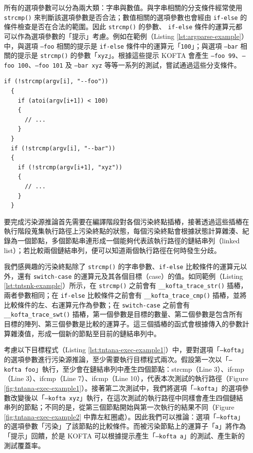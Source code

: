 所有的選項參數可以分為兩大類：字串與數值。與字串相關的分支條件經常使用 \texttt{strcmp()} 來判斷該選項參數是否合法；數值相關的選項參數也會經由 \texttt{if-else} 的條件檢查是否在合法的範圍。因此  \texttt{strcmp()} 的參數、 \texttt{if-else} 條件的運算元都可以作為選項參數的「提示」考慮。例如在範例（Listing \ref{lst:argparse-example}）中，與選項 \texttt{--foo} 相關的提示是 \texttt{if-else} 條件中的運算元「\texttt{100}」；與選項 \texttt{--bar} 相關的提示是 \texttt{strcmp()} 的參數「\texttt{xyz}」。根據這些提示 KOFTA 會產生 \texttt{--foo 99}、\texttt{--foo 100}、\texttt{--foo 101} 及 \texttt{--bar xyz} 等等一系列的測試，嘗試通過這些分支條件。

\begin{lstlisting}[caption=選項參數解析範例, label=lst:argparse-example]
  if (!strcmp(argv[i], "--foo"))
  {
    if (atoi(argv[i+1]) < 100)
    {
      // ...
    }
  }
  if (!strcmp(argv[i], "--bar"))
  {
    if (!strcmp(argv[i+1], "xyz"))
    {
      // ...
    }
  }
\end{lstlisting}

要完成污染源推論首先需要在編譯階段對各個污染終點插樁，接著透過這些插樁在執行階段蒐集執行路徑上污染終點的狀態，每個污染終點會根據狀態計算雜湊、紀錄為一個節點，多個節點串連形成一個能夠代表該執行路徑的鏈結串列（linked list）；若比較兩個鏈結串列，便可以知道兩個執行路徑在何時發生分歧。

我們感興趣的污染終點除了 \texttt{strcmp()} 的字串參數、\texttt{if-else} 比較條件的運算元以外，還有 \texttt{switch-case} 的運算元及其各個目標（case）的值。如同範例（Listing \ref{lst:tntsnk-example}）所示，在 \texttt{strcmp()} 之前會有 \texttt{\_\_kofta\_trace\_str()} 插樁，兩者參數相同；在 \texttt{if-else} 比較條件之前會有 \texttt{\_\_kofta\_trace\_cmp()} 插樁，並將比較條件的左、右運算元作為參數；在 \texttt{switch-case} 之前會有 \texttt{\_\_kofta\_trace\_swt()} 插樁，第一個參數是目標的數量、第二個參數是包含所有目標的陣列、第三個參數是比較的運算子。這三個插樁的函式會根據傳入的參數計算雜湊值，形成一個新的節點至目前的鏈結串列中。

考慮以下目標程式（Listing \ref{lst:tntana-exec-example1}）中，要對選項「\texttt{--kofta}」的選項參數進行污染源推論，至少需要執行目標程式兩次。假設第一次以「\texttt{--kofta foo}」執行，至少會在鏈結串列中產生四個節點：strcmp（Line 3）、ifcmp（Line 3）、ifcmp（Line 7）、ifcmp（Line 10），代表本次測試的執行路徑（Figure \ref{fig:tntana-exec-example1}）。接著第二次測試中，我們將選項「\texttt{--kofta}」的選項參數改變後以「\texttt{--kofta xyz}」執行，在這次測試的執行路徑中同樣會產生四個鏈結串列的節點；不同的是，從第三個節點開始與第一次執行的結果不同（Figure \ref{fig:tntana-exec-example2} 中靠左紅圈處）。因此我們可以推論：選項「\texttt{--kofta}」的選項參數「污染」了該節點的比較條件。而被污染節點上的運算子「\texttt{a}」將作為「提示」回饋，於是 KOFTA 可以根據提示產生「\texttt{--kofta a}」的測試、產生新的測試覆蓋率。

